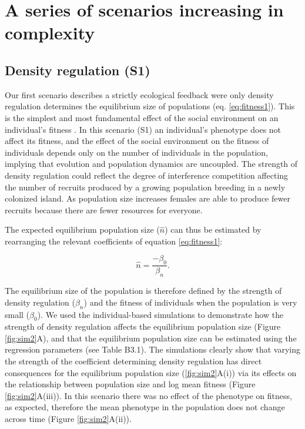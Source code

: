 \documentclass{article}
\begin{document}
\section{A series of scenarios increasing in complexity}
\subsection{Density regulation (S1)}
Our first scenario describes a strictly ecological feedback were only density regulation determines the equilibrium size of populations (eq. \ref{eq:fitness1}). This is the simplest and most fundamental effect of the social environment on an individual's fitness \citep{Brook2006}. In this scenario (S1) an individual's phenotype does not affect its fitness, and the effect of the social environment on the fitness of individuals depends only on the number of individuals in the population, implying that evolution and population dynamics are uncoupled. The strength of density regulation could reflect the degree of interference competition affecting the number of recruits produced by a growing population breeding in a newly colonized island. As population size increases females are able to produce fewer recruits because there are fewer resources for everyone. 

The expected equilibrium population size ($\hat{n}$) can thus be estimated by rearranging the relevant coefficients of equation \ref{eq:fitness1}:

\begin{equation}\label{eq:equilibrium}
\hat{n}=\frac{-\beta_{0}}{\beta_n}. 
\end{equation} 

\noindent The equilibrium size of the population is therefore defined by the strength of density regulation ($\beta_n$) and the fitness of individuals when the population is very small ($\beta_0$). We used the individual-based simulations to demonstrate how the strength of density regulation affects the equilibrium population size (Figure \ref{fig:sim2}A), and that the equilibrium population size can be estimated using the regression parameters (see Table B3.1). The simulations clearly show that varying the strength of the coefficient determining density regulation has direct consequences for the equilibrium population size (\ref{fig:sim2}A(i)) via its effects on the relationship between population size and log mean fitness (Figure \ref{fig:sim2}A(iii)). In this scenario there was no effect of the phenotype on fitness, as expected, therefore the mean phenotype in the population does not change across time (Figure \ref{fig:sim2}A(ii)). 
\end{document}
